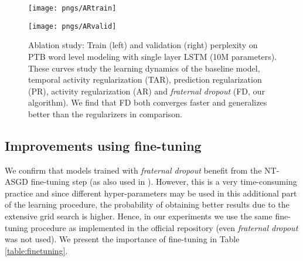 \documentclass{article} \usepackage{iclr2018_conference,times}
\begin{document}
\begin{figure}[t]
\vspace{-0.08cm}
  \centering
  \begin{minipage}[b]{0.48\textwidth}
    \texttt{[image: pngs/ARtrain]}
  \end{minipage}
  \hfill
  \begin{minipage}[b]{0.48\textwidth}
    \texttt{[image: pngs/ARvalid]}
  \end{minipage}
  \caption{Ablation study: Train (left) and validation (right) perplexity on PTB word level modeling with single layer LSTM (10M parameters). These curves study the learning dynamics of the baseline model, temporal activity regularization (TAR), prediction regularization (PR), activity regularization (AR) and \emph{fraternal dropout} (FD, our algorithm). We find that FD both converges faster and generalizes better than the regularizers in comparison.}
\label{fig_ar_tar}
\vspace{-0.08cm}
\end{figure}

\subsection{Improvements using fine-tuning}
\label{finetuning}

We confirm that models trained with \emph{fraternal dropout} benefit from the NT-ASGD fine-tuning step (as also used in \citet{merity2017regularizing}). However, this is a very time-consuming practice and since different hyper-parameters may be used in this additional part of the learning procedure, the probability of obtaining better results due to the extensive grid search is higher. Hence, in our experiments we use the same fine-tuning procedure as implemented in the official repository (even \emph{fraternal dropout} was not used). We present the importance of fine-tuning in Table \ref{table:finetuning}.
\end{document}
